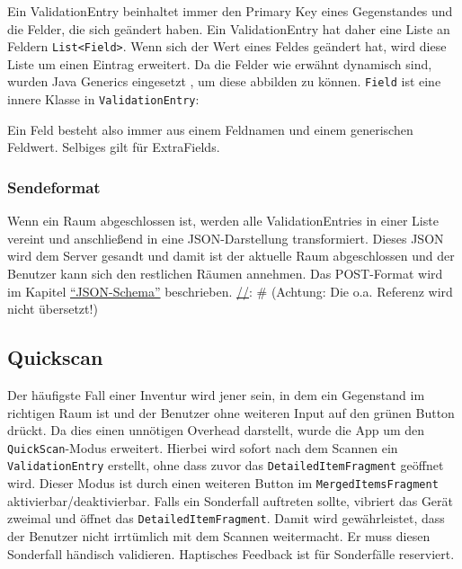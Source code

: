 Ein ValidationEntry beinhaltet immer den Primary Key eines Gegenstandes
und die Felder, die sich geändert haben. Ein ValidationEntry hat daher
eine Liste an Feldern \texttt{List\textless{}Field\textgreater{}}. Wenn
sich der Wert eines Feldes geändert hat, wird diese Liste um einen
Eintrag erweitert. Da die Felder wie erwähnt dynamisch sind, wurden Java
Generics eingesetzt \cite{java-generics}, um diese abbilden zu können.
\texttt{Field} ist eine innere Klasse in \texttt{ValidationEntry}:

\begin{Shaded}
\begin{Highlighting}[]
   
     
\end{Highlighting}
\end{Shaded}

Ein Feld besteht also immer aus einem Feldnamen und einem generischen
Feldwert. Selbiges gilt für ExtraFields.

\hypertarget{sendeformat}{%
\subsubsection{Sendeformat}\label{sendeformat}}

Wenn ein Raum abgeschlossen ist, werden alle ValidationEntries in einer
Liste vereint und anschließend in eine JSON-Darstellung transformiert.
Dieses JSON wird dem Server gesandt und damit ist der aktuelle Raum
abgeschlossen und der Benutzer kann sich den restlichen Räumen annehmen.
Das POST-Format wird im Kapitel \href{json-schema}{``JSON-Schema''}
beschrieben. \protect\hyperlink{}{//}: \# (Achtung: Die o.a. Referenz
wird nicht übersetzt!)

\hypertarget{quickscan}{%
\subsection{Quickscan}\label{quickscan}}

Der häufigste Fall einer Inventur wird jener sein, in dem ein Gegenstand
im richtigen Raum ist und der Benutzer ohne weiteren Input auf den
grünen Button drückt. Da dies einen unnötigen Overhead darstellt, wurde
die App um den \texttt{QuickScan}-Modus erweitert. Hierbei wird sofort
nach dem Scannen ein \texttt{ValidationEntry} erstellt, ohne dass zuvor
das \texttt{DetailedItemFragment} geöffnet wird. Dieser Modus ist durch
einen weiteren Button im \texttt{MergedItemsFragment}
aktivierbar/deaktivierbar. Falls ein Sonderfall auftreten sollte,
vibriert das Gerät zweimal und öffnet das \texttt{DetailedItemFragment}.
Damit wird gewährleistet, dass der Benutzer nicht irrtümlich mit dem
Scannen weitermacht. Er muss diesen Sonderfall händisch validieren.
Haptisches Feedback ist für Sonderfälle reserviert.

